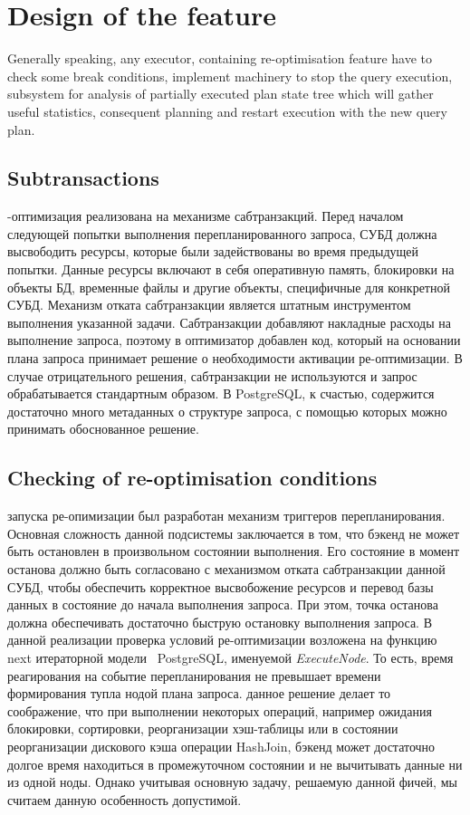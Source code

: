 \documentclass{article}
\begin{document}
\section{Design of the feature}
Generally speaking, any executor, containing re-optimisation feature have to check some break conditions, implement machinery to stop the query execution, subsystem for analysis of partially executed plan state tree which will gather useful statistics, consequent planning and restart execution with the new query plan.
\subsection{Subtransactions}
-оптимизация реализована на механизме сабтранзакций. Перед началом следующей попытки выполнения перепланированного запроса, СУБД должна высвободить ресурсы, которые были задействованы во время предыдущей попытки. Данные ресурсы включают в себя оперативную память, блокировки на объекты БД, временные файлы и другие объекты, специфичные для конкретной СУБД. Механизм отката сабтранзакции является штатным инструментом выполнения указанной задачи. Сабтранзакции добавляют накладные расходы на выполнение запроса, поэтому в оптимизатор добавлен код, который на основании плана запроса принимает решение о необходимости активации ре-оптимизации. В случае отрицательного решения, сабтранзакции не используются и запрос обрабатывается стандартным образом. В PostgreSQL, к счастью, содержится достаточно много метаданных о структуре запроса, с помощью которых можно принимать обоснованное решение.
\subsection{Checking of re-optimisation conditions}
 запуска ре-опимизации был разработан механизм триггеров перепланирования. Основная сложность данной подсистемы заключается в том, что бэкенд не может быть остановлен в произвольном состоянии выполнения. Его состояние в момент останова должно быть согласовано с механизмом отката сабтранзакции данной СУБД, чтобы обеспечить корректное высвобожение ресурсов и перевод базы данных в состояние до начала выполнения запроса. При этом, точка останова должна обеспечивать достаточно быструю остановку выполнения запроса. В данной реализации проверка условий ре-оптимизации возложена на функцию next итераторной модели~\cite{Graefe1992} PostgreSQL, именуемой \textit{ExecuteNode}. То есть, время реагирования на событие перепланирования не превышает времени формирования тупла нодой плана запроса.
 данное решение делает то соображение, что при выполнении некоторых операций, например ожидания блокировки, сортировки, реорганизации хэш-таблицы или в состоянии реорганизации дискового кэша операции HashJoin, бэкенд может достаточно долгое время находиться в промежуточном состоянии и не вычитывать данные ни из одной ноды. Однако учитывая основную задачу, решаемую данной фичей, мы считаем данную особенность допустимой.
\end{document}
